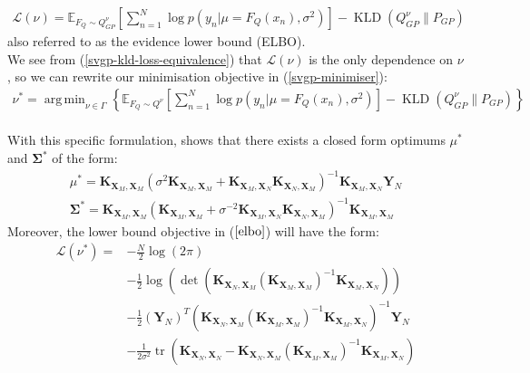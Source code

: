 \documentclass[twoside,11pt]{article}
\newcommand{\KLD}{\operatorname{KLD}}
\newcommand{\tr}{\operatorname{tr}}
\DeclareMathOperator*{\argmin}{arg\,min}
\begin{document}
\begin{align}
    \mathcal{L}(\nu) = \mathbb{E}_{F_Q \sim Q_{GP}^{\nu}}\left[\sum_{n=1}^{N}\log p\left(y_n \vert \mu=F_Q(x_n), \sigma^2\right)\right] -\KLD\left(Q^{\nu}_{GP}\Big\| P_{GP}\right) 
    \label{elbo}
\end{align}
also referred to as the evidence lower bound (ELBO). 
\\We see from (\ref{svgp-kld-loss-equivalence}) that $\mathcal{L}(\nu)$ is the only dependence on $\nu$, so we can rewrite our minimisation objective in (\ref{svgp-minimiser}):
\begin{align}
    \nu^* = \argmin_{\nu \in \Gamma} \left\{\mathbb{E}_{F_Q \sim Q^{\nu}}\left[\sum_{n=1}^{N}\log p\left(y_n \vert \mu=F_Q(x_n), \sigma^2\right)\right] -\KLD\left(Q^{\nu}_{GP}\Big\| P_{GP}\right)\right\}
    \label{svgp-minimiser-gvi-kld}
\end{align}
\\With this specific formulation, \cite{titsias2009variational} shows that there exists a closed form optimums $\mu^*$ and $\mathbf{\Sigma}^*$ of the form:
\begin{align}
    \label{svgp-optimal-mean}
    \mu^* = \mathbf{K}_{\mathbf{X}_M, \mathbf{X}_M} \left( \sigma^2 \mathbf{K}_{\mathbf{X}_M, \mathbf{X}_M} + \mathbf{K}_{\mathbf{X}_M, \mathbf{X}_N}\mathbf{K}_{\mathbf{X}_N, \mathbf{X}_M}\right)^{-1}\mathbf{K}_{\mathbf{X}_M, \mathbf{X}_N} \mathbf{Y}_N\\
    \label{svgp-optimal-covariance}
    \mathbf{\Sigma}^* = \mathbf{K}_{\mathbf{X}_M, \mathbf{X}_M} \left(\mathbf{K}_{\mathbf{X}_M, \mathbf{X}_M} +  \sigma^{-2}\mathbf{K}_{\mathbf{X}_M, \mathbf{X}_N}\mathbf{K}_{\mathbf{X}_N, \mathbf{X}_M}\right)^{-1}\mathbf{K}_{\mathbf{X}_M, \mathbf{X}_M}
\end{align}
Moreover, the lower bound objective in ($\ref{elbo}$) will have the form:
\begin{align}
    \label{svgp-optimal-elbo}
    \mathcal{L}(\nu^*) = &-\frac{N}{2} \log\left(2\pi \right)\\
    &-\frac{1}{2} \log \left(\det\left( \mathbf{K}_{\mathbf{X}_N, \mathbf{X}_M}\left(\mathbf{K}_{\mathbf{X}_M, \mathbf{X}_M}\right)^{-1} \mathbf{K}_{\mathbf{X}_M, \mathbf{X}_N}\right)\right)\\
    & -\frac{1}{2} \left(\mathbf{Y}_N\right)^T \left( \mathbf{K}_{\mathbf{X}_N, \mathbf{X}_M}\left(\mathbf{K}_{\mathbf{X}_M, \mathbf{X}_M}\right)^{-1} \mathbf{K}_{\mathbf{X}_M, \mathbf{X}_N}\right)^{-1} \mathbf{Y}_N \\
    &  - \frac{1}{2\sigma^2}\tr\left(\mathbf{K}_{\mathbf{X}_N, \mathbf{X}_N} - \mathbf{K}_{\mathbf{X}_N, \mathbf{X}_M}\left(\mathbf{K}_{\mathbf{X}_M, \mathbf{X}_M}\right)^{-1} \mathbf{K}_{\mathbf{X}_M, \mathbf{X}_N}\right)
\end{align}
\end{document}
